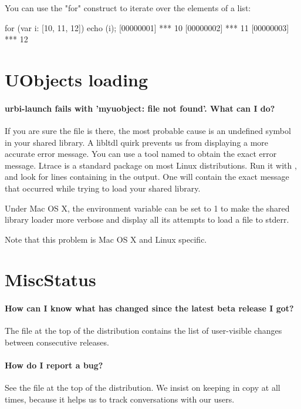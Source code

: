 You can use the "for" construct to iterate over the elements of a list:

\begin{urbiscript}
for (var i: [10, 11, 12]) echo (i);
[00000001] *** 10
[00000002] *** 11
[00000003] *** 12
\end{urbiscript}

\section{UObjects loading}

\paragraph{urbi-launch fails with 'myuobject: file not found'. What can I do?}
If you are sure the file is there, the most probable cause is an
undefined symbol in your shared library. A libltdl quirk prevents us
from displaying a more accurate error message.  You can use a tool
named  to obtain the exact error message.  Ltrace is a
standard package on most Linux distributions.  Run it with
, and look for lines
containing  in the output. One will contain the exact
message that occurred while trying to load your shared library.

Under Mac OS X, the  environment variable can
be set to 1 to make the shared library loader more verbose and display
all its attempts to load a file to stderr.

Note that this problem is Mac OS X and Linux specific.

\section{MiscStatus}
\paragraph{How can I know what has changed since the latest beta release I got?}
The file  at the top of the distribution
contains the list of user-visible changes between consecutive
releases.

\paragraph{How do I report a bug?}
See the file  at the top of the
distribution. We insist on keeping  in
copy at all times, because it helps us to track conversations with our
users.


